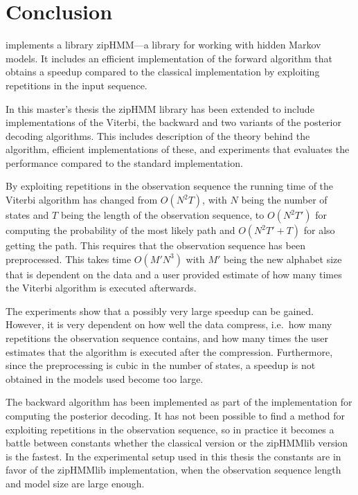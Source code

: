 \chapter{Conclusion}
\label{cha:conclusion}

\citet{sand2013ziphmmlib} implements a library zipHMM---a library for working
with hidden Markov models. It includes an efficient implementation of the forward
algorithm that obtains a speedup compared to the classical implementation by
exploiting repetitions in the input sequence.

In this master's thesis the zipHMM library has been extended to include
implementations of the Viterbi, the backward and two variants of the posterior
decoding algorithms. This includes description of the theory behind the
algorithm, efficient implementations of these, and experiments that evaluates
the performance compared to the standard implementation.

By exploiting repetitions in the observation sequence the running time of the
Viterbi algorithm has changed from $O(N^2 T)$, with $N$ being the number of
states and $T$ being the length of the observation sequence, to $O(N^2 T')$ for
computing the probability of the most likely path and $O(N^2 T' + T)$ for also
getting the path. This requires that the observation sequence has been
preprocessed. This takes time $O(M' N^3)$ with $M'$ being the new alphabet size
that is dependent on the data and a user provided estimate of how many times
the Viterbi algorithm is executed afterwards.

The experiments show that a possibly very large speedup can be gained. However,
it is very dependent on how well the data compress, i.e.\ how many repetitions
the observation sequence contains, and how many times the user estimates that the
algorithm is executed after the compression. Furthermore, since the
preprocessing is cubic in the number of states, a speedup is not obtained in
the models used become too large.

The backward algorithm has been implemented as part of the implementation for
computing the posterior decoding. It has not been possible to find a method for
exploiting repetitions in the observation sequence, so in practice it becomes a
battle between constants whether the classical version or the zipHMMlib version
is the fastest. In the experimental setup used in this thesis the constants are
in favor of the zipHMMlib implementation, when the observation sequence length and
model size are large enough.

